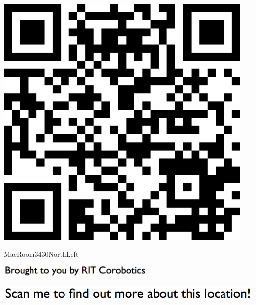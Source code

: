 \documentclass[letterpaper]{article}
\begin{document}
 \begingroup 
 \centerline{\includegraphics[scale=1,width=5in,height=5in]{MacRoom3430NorthLeft.png}} 
 \endgroup 
 \vspace*{\fill} 

 \hfill{\small MacRoom3430NorthLeft} 

  \vspace{0.7in} 
 
 \centerline{\includegraphics[scale=1,width=3in]{text-bottom.png}} 
 
 \pagebreak 
{} 
 \vspace*{\fill} 
 
  \centerline{\includegraphics[scale=1,width=6in]{text-top.png}} 
 
 \vspace{0.5in} 
 
\end{document}
